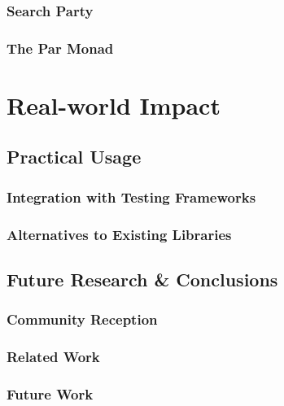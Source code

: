 \documentclass[openright, dottedtoc, headinclude, footinclude=true, a4paper, numbers=noenddot]{scrreprt}
\begin{document}
  \section{Search Party}
  \label{sec:casestudies-searchparty}
  

  \section{The Par Monad}
  \label{sec:casestudies-parmonad}
  

\part{Real-world Impact}
\label{part:impact}

\null\clearpage
\chapter{Practical Usage}
\label{chap:practice}


  \section{Integration with Testing Frameworks}
  \label{sec:practice-integration}
  

  \section{Alternatives to Existing Libraries}
  \label{sec:practice-alternatives}
  

\null\clearpage

\chapter{Future Research \& Conclusions}
\label{chap:conclusions}


  \section{Community Reception}
  \label{sec:conclusions-reception}
  

  \section{Related Work}
  \label{sec:conclusions-related}
  

  \section{Future Work}
  \label{sec:conclusions-future}
  

\if@openright
  \cleardoublepage
\else
  \clearpage
\fi



\end{document}
